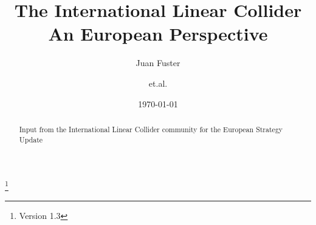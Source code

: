 \documentclass[%
 reprint,
 floatfix,
 amsmath,amssymb,
 aps,
]{revtex4-1}
\begin{document}

\title{The International Linear Collider\\ An European Perspective}%
\thanks{Version 1.3}%

\author{Juan Fuster}
\author{et.al.}%
%


\date{\today}%

\begin{abstract}
Input from the International Linear Collider community for the European Strategy Update

\end{abstract}

\maketitle

\end{document}
